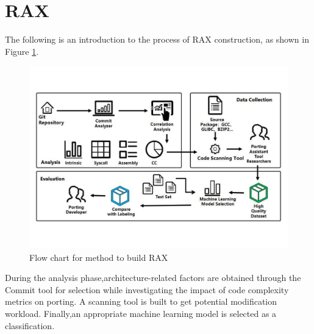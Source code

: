 \documentclass[sigconf,screen,review,anonymous]{acmart}
\begin{document}

\section{RAX}
The following is an introduction to the process of RAX construction, as shown in Figure \ref{fig:figure1}.
\begin{figure}
  \centering
  \includegraphics[width=\linewidth]{figure1.pdf}
  \caption{Flow chart for method to build RAX}
  \label{fig:figure1}
\end{figure}
During the analysis phase,architecture-related factors are obtained through the Commit tool for selection while investigating the impact of code complexity metrics on porting.
A scanning tool is built to get potential modification workload.
Finally,an appropriate machine learning model is selected as a classification.
\end{document}
